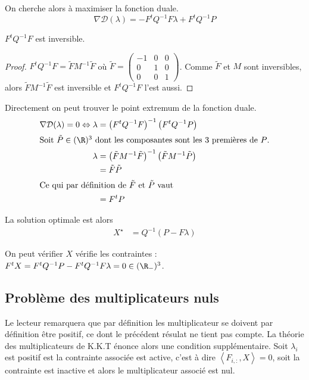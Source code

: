 On cherche alors à maximiser la fonction duale.
\begin{equation}
\nabla \mathcal D (\lambda) = -F^tQ^{-1}F\lambda + F^tQ^{-1}P
\end{equation}

\begin{prop}[Inversibilité de $F^tQ^{-1}F$]
  $F^tQ^{-1}F$ est inversible.
\end{prop}
\begin{proof}
$F^tQ^{-1}F = \tilde FM^{-1}\tilde F$ où $\tilde F = \begin{pmatrix}
-1 & 0 & 0 \\
0 & 1 & 0 \\
0 & 0 & 1
\end{pmatrix}$.  Comme $\tilde F$ et $M$ sont inversibles, alors $\tilde FM^{-1}\tilde F$ est inversible et $F^tQ^{-1}F$ l'est aussi.
\end{proof}

Directement on peut trouver le point extremum de la fonction duale.
\begin{align}
\nabla \mathcal D (\lambda) = 0 \Leftrightarrow \lambda &= \left(F^tQ^{-1}F\right)^{-1}\left(F^tQ^{-1}P\right)\\
\intertext{Soit $\tilde P\in (\R)^3$ dont les composantes sont les 3 premières de $P$.}
\lambda &  = \left(\tilde FM^{-1}\tilde F\right)^{-1}\left(\tilde FM^{-1}\tilde P\right) \\
& = \tilde F\tilde P\\
\intertext{Ce qui par définition de $\tilde F$ et $\tilde P$ vaut}
& = F^tP
\end{align}

La solution optimale est alors
\begin{align}
X^\star &= Q^{-1}\left(P- F\lambda\right)
\end{align}

On peut vérifier $X$ vérifie les contraintes : $ F^t X = F^t Q^{-1} P - F^tQ^{-1}F\lambda = 0 \in (\R_-)^3$.

\subsection{Problème des multiplicateurs nuls}
Le lecteur remarquera que par définition les multiplicateur se doivent par définition être positif, ce dont le précédent résulat ne tient pas compte. La théorie des multiplicateurs de K.K.T énonce alors une condition supplémentaire. Soit $\lambda_i$ est positif est la contrainte associée est active, c'est à dire $\left<F_{i,:},X\right> = 0$, soit la contrainte est inactive et alors le multiplicateur associé est nul.


